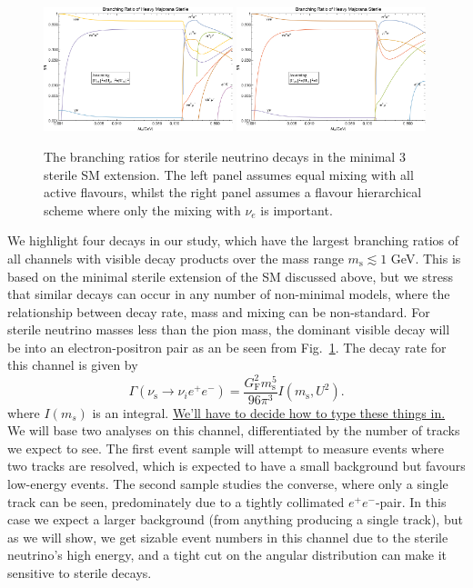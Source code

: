 \documentclass[11pt, a4paper]{article}
\newcommand{\reffig}[1]{Fig.~\ref{#1}}
\newcommand{\newtext}[2]{\textcolor{#1}{\ul{#2}}}
\begin{document}
\begin{figure}[t]
%
\includegraphics[width=0.49\textwidth]{figures/bounds1.pdf}
\includegraphics[width=0.49\textwidth]{figures/bounds2.pdf}
%
\caption{\label{fig:branchingratios}The branching ratios for sterile neutrino
decays in the minimal 3 sterile SM extension. The left panel assumes equal
mixing with all active flavours, whilst the right panel assumes a flavour
hierarchical scheme where only the mixing with $\nu_e$ is important.}
%
\end{figure}

We highlight four decays in our study, which have the largest branching ratios
of all channels with visible decay products over the mass range $m_\text{s}
\lesssim 1$ GeV. This is based on the minimal sterile extension of the SM
discussed above, but we stress that similar decays can occur in any number of
non-minimal models, where the relationship between decay rate, mass and mixing
can be non-standard. For sterile neutrino masses less than the pion mass, the
dominant visible decay will be into an electron-positron pair as an be seen
from \reffig{fig:branchingratios}. The decay rate for this channel is given by 
%
\[ \Gamma\left(\nu_\text{s}\to \nu_i e^+e^-\right) =
\frac{G_\text{F}^2m_\text{s}^5}{96\pi^3}I(m_\text{s}, U^2).  \]
%
where $I(m_s)$ is an integral. \newtext{PB}{We'll have to decide how to type these things in.}
%
We will base two analyses on this channel, differentiated by the number of
tracks we expect to see. The first event sample will attempt to measure events
where two tracks are resolved, which is expected to have a small background but
favours low-energy events. The second sample studies the converse, where only a
single track can be seen, predominately due to a tightly collimated
$e^+e^-$-pair. In this case we expect a larger background (from anything
producing a single track), but as we will show, we get sizable event numbers in
this channel due to the sterile neutrino's high energy, and a tight cut on the
angular distribution can make it sensitive to sterile decays.
\end{document}
